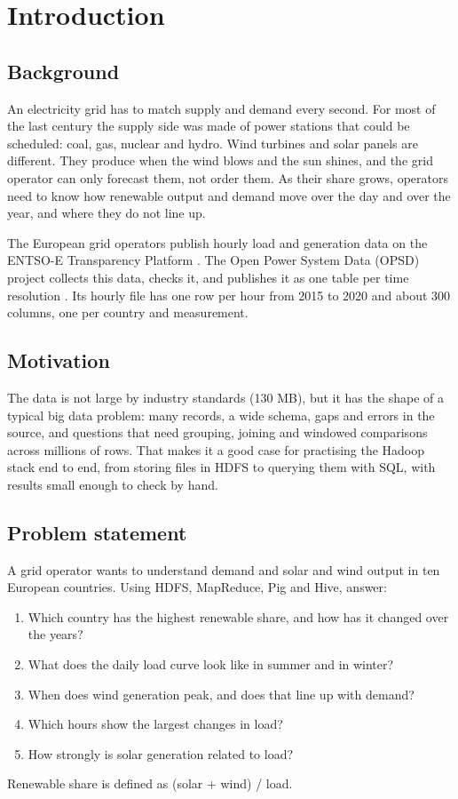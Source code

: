 \documentclass[12pt,a4paper]{report}
\begin{document}
\chapter{Introduction}

\section{Background}
An electricity grid has to match supply and demand every second. For most of the last century the supply side was made of power stations that could be scheduled: coal, gas, nuclear and hydro. Wind turbines and solar panels are different. They produce when the wind blows and the sun shines, and the grid operator can only forecast them, not order them. As their share grows, operators need to know how renewable output and demand move over the day and over the year, and where they do not line up.

The European grid operators publish hourly load and generation data on the ENTSO-E Transparency Platform \cite{entsoe}. The Open Power System Data (OPSD) project collects this data, checks it, and publishes it as one table per time resolution \cite{opsd2020,wiese2019}. Its hourly file has one row per hour from 2015 to 2020 and about 300 columns, one per country and measurement.

\section{Motivation}
The data is not large by industry standards (130 MB), but it has the shape of a typical big data problem: many records, a wide schema, gaps and errors in the source, and questions that need grouping, joining and windowed comparisons across millions of rows. That makes it a good case for practising the Hadoop stack end to end, from storing files in HDFS to querying them with SQL, with results small enough to check by hand.

\section{Problem statement}
A grid operator wants to understand demand and solar and wind output in ten European countries. Using HDFS, MapReduce, Pig and Hive, answer:
\begin{enumerate}
\item Which country has the highest renewable share, and how has it changed over the years?
\item What does the daily load curve look like in summer and in winter?
\item When does wind generation peak, and does that line up with demand?
\item Which hours show the largest changes in load?
\item How strongly is solar generation related to load?
\end{enumerate}
Renewable share is defined as (solar + wind) / load.
\end{document}

